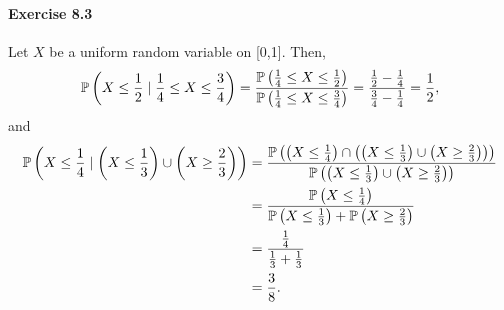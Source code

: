 \paragraph{Exercise 8.3} Let $X$ be a uniform random variable on [0,1]. Then,
\[
    \mathbb{P}\left(X \leq \frac{1}{2} \mid \frac{1}{4} \leq X \leq \frac{3}{4}\right)
    = \frac{\mathbb{P}\left(\frac{1}{4} \leq X \leq \frac{1}{2}\right)}{\mathbb{P}\left(\frac{1}{4} \leq X \leq \frac{3}{4}\right)}
    = \frac{\frac{1}{2} - \frac{1}{4}}{\frac{3}{4} - \frac{1}{4}}
    = \frac{1}{2},
\]
and
\begin{align*}
    \mathbb{P}\left(X \leq \frac{1}{4} \mid \left(X \leq \frac{1}{3}\right) \cup \left( X \geq \frac{2}{3}\right) \right)
    &= \frac{\mathbb{P}\left(\left(X \leq \frac{1}{4} \right) \cap \left( \left(X \leq \frac{1}{3}\right) \cup \left( X \geq \frac{2}{3}\right) \right) \right)}{\mathbb{P}\left(\left(X \leq \frac{1}{3}\right) \cup \left( X \geq \frac{2}{3}\right) \right)} \\
    &= \frac{\mathbb{P}\left(X \leq \frac{1}{4}\right)}{\mathbb{P}\left(X \leq \frac{1}{3} \right) + \mathbb{P}\left(X \geq \frac{2}{3}\right)} \\
    & = \frac{\frac{1}{4}}{\frac{1}{3} + \frac{1}{3}} \\
    &= \frac{3}{8}.
\end{align*}
